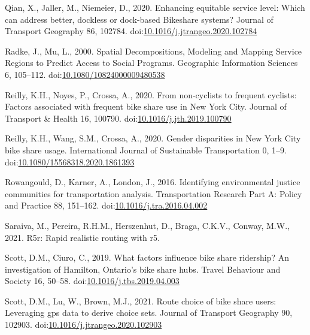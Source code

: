 \documentclass[]{elsarticle} %
\begin{document}
\leavevmode\hypertarget{ref-qianEnhancingEquitableService2020}{}%
Qian, X., Jaller, M., Niemeier, D., 2020. Enhancing equitable service
level: Which can address better, dockless or dock-based Bikeshare
systems? Journal of Transport Geography 86, 102784.
doi:\href{https://doi.org/10.1016/j.jtrangeo.2020.102784}{10.1016/j.jtrangeo.2020.102784}

\leavevmode\hypertarget{ref-radkeSpatialDecompositionsModeling2000}{}%
Radke, J., Mu, L., 2000. Spatial Decompositions, Modeling and Mapping
Service Regions to Predict Access to Social Programs. Geographic
Information Sciences 6, 105--112.
doi:\href{https://doi.org/10.1080/10824000009480538}{10.1080/10824000009480538}

\leavevmode\hypertarget{ref-reillyNoncyclistsFrequentCyclists2020}{}%
Reilly, K.H., Noyes, P., Crossa, A., 2020. From non-cyclists to frequent
cyclists: Factors associated with frequent bike share use in New York
City. Journal of Transport \& Health 16, 100790.
doi:\href{https://doi.org/10.1016/j.jth.2019.100790}{10.1016/j.jth.2019.100790}

\leavevmode\hypertarget{ref-reillyGenderDisparitiesNew2020}{}%
Reilly, K.H., Wang, S.M., Crossa, A., 2020. Gender disparities in New
York City bike share usage. International Journal of Sustainable
Transportation 0, 1--9.
doi:\href{https://doi.org/10.1080/15568318.2020.1861393}{10.1080/15568318.2020.1861393}

\leavevmode\hypertarget{ref-rowangouldIdentifyingEnvironmentalJustice2016}{}%
Rowangould, D., Karner, A., London, J., 2016. Identifying environmental
justice communities for transportation analysis. Transportation Research
Part A: Policy and Practice 88, 151--162.
doi:\href{https://doi.org/10.1016/j.tra.2016.04.002}{10.1016/j.tra.2016.04.002}

\leavevmode\hypertarget{ref-R-r5r}{}%
Saraiva, M., Pereira, R.H.M., Herszenhut, D., Braga, C.K.V., Conway,
M.W., 2021. R5r: Rapid realistic routing with r5.

\leavevmode\hypertarget{ref-scottWhatFactorsInfluence2019}{}%
Scott, D.M., Ciuro, C., 2019. What factors influence bike share
ridership? An investigation of Hamilton, Ontario's bike share hubs.
Travel Behaviour and Society 16, 50--58.
doi:\href{https://doi.org/10.1016/j.tbs.2019.04.003}{10.1016/j.tbs.2019.04.003}

\leavevmode\hypertarget{ref-scottRouteChoiceBike2021}{}%
Scott, D.M., Lu, W., Brown, M.J., 2021. Route choice of bike share
users: Leveraging gps data to derive choice sets. Journal of Transport
Geography 90, 102903.
doi:\href{https://doi.org/10.1016/j.jtrangeo.2020.102903}{10.1016/j.jtrangeo.2020.102903}
\end{document}
